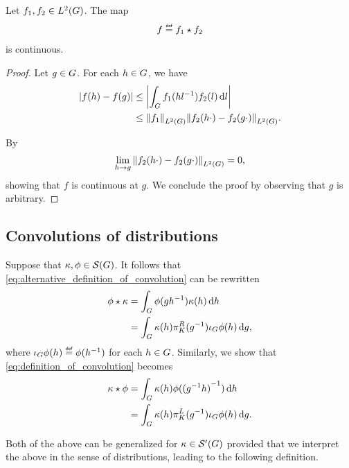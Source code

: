 \begin{lemma}
    Let $f_1, f_2 \in \Lebesgue 2 \Group$.
    The map
    \begin{align*}
        f \defeq \conv {f_1} {f_2}
    \end{align*}
    is continuous.
\end{lemma}
\begin{proof}
    Let $g \in \Group$.
    For each $h \in \Group$,
    we have
    \begin{align*}
        \abs {f(h) - f(g)} &\leq \abs {\int_\Group f_1(h l^{-1}) f_2(l) \dd l}\\
        &\leq \norm [\Lebesgue 2 \Group] {f_1} \norm [\Lebesgue 2 \Group] {f_2(h \dummy) - f_2(g \dummy)}.
    \end{align*}

    By %
    \begin{align*}
        \lim_{h \to g} \norm [\Lebesgue 2 \Group] {f_2(h \dummy) - f_2(g \dummy)} = 0,
    \end{align*}
    showing that $f$ is continuous at $g$.
    We conclude the proof by observing that $g$ is arbitrary.
\end{proof}

\subsection{Convolutions of distributions}

Suppose that $\kappa, \phi \in \Schwartz \Group$.
It follows that \eqref{eq:alternative_definition_of_convolution} can be rewritten
\begin{align*}
    \conv \phi \kappa &= \int_\Group \phi(g h^{-1}) \kappa(h) \dd h\\
    &= \int_\Group \kappa(h) \RightRegularRepresentation(g^{-1}) \InverseFunctionArgument \phi(h) \dd g,
\end{align*}
where $\InverseFunctionArgument \phi(h) \defeq \phi(h^{-1})$ for each $h \in \Group$.
Similarly, we show that \eqref{eq:definition_of_convolution} becomes
\begin{align*}
    \conv \kappa \phi &= \int_\Group \kappa(h) \phi({(g^{-1} h)}^{-1}) \dd h\\
    &= \int_\Group \kappa(h) \LeftRegularRepresentation(g^{-1}) \InverseFunctionArgument \phi(h) \dd g.
\end{align*}

Both of the above can be generalized for $\kappa \in \TemperedDistributions \Group$
provided that we interpret the above in the sense of distributions,
leading to the following definition.

